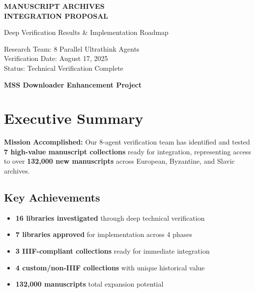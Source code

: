 \documentclass[11pt,a4paper]{article}
\begin{document}
\begin{titlepage}
\centering
\vspace*{2cm}

{\Huge\bfseries\color{primary}
MANUSCRIPT ARCHIVES\\
INTEGRATION PROPOSAL
}

\vspace{1cm}
{\Large\color{gray800}
Deep Verification Results \& Implementation Roadmap
}

\vspace{2cm}


\vspace{2cm}

{\large\color{gray600}
Research Team: 8 Parallel Ultrathink Agents\\
Verification Date: August 17, 2025\\
Status: Technical Verification Complete
}

\vfill

{\large\color{primary}\bfseries
MSS Downloader Enhancement Project
}

\end{titlepage}

\section{Executive Summary}

\begin{infobox}
\textbf{Mission Accomplished:} Our 8-agent verification team has identified and tested \textbf{7 high-value manuscript collections} ready for integration, representing access to over \textbf{132,000 new manuscripts} across European, Byzantine, and Slavic archives.
\end{infobox}

\subsection{Key Achievements}

\begin{itemize}[leftmargin=*]
    \item \textbf{16 libraries investigated} through deep technical verification
    \item \textbf{7 libraries approved} for implementation across 4 phases
    \item \textbf{3 IIIF-compliant collections} ready for immediate integration
    \item \textbf{4 custom/non-IIIF collections} with unique historical value
    \item \textbf{132,000 manuscripts} total expansion potential
\end{itemize}
\end{document}
